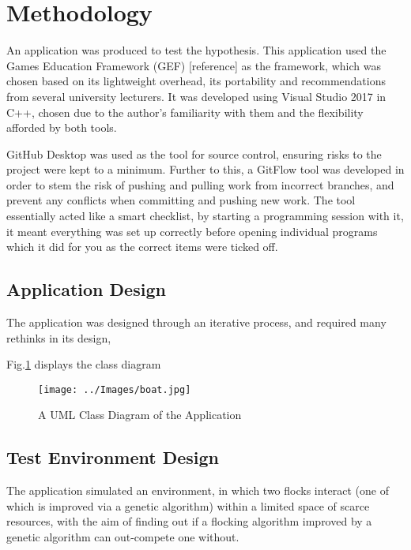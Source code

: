 \section{Methodology}
An application was produced to test the hypothesis. This application used the Games Education Framework (GEF) [reference] as the framework, which was chosen based on its lightweight overhead, its portability and recommendations from several university lecturers. It was developed using Visual Studio 2017 in C++, chosen due to the author's familiarity with them and the flexibility afforded by both tools.

GitHub Desktop was used as the tool for source control, ensuring risks to the project were kept to a minimum. Further to this, a GitFlow tool was developed in order to stem the risk of pushing and pulling work from incorrect branches, and prevent any conflicts when committing and pushing new work. The tool essentially acted like a smart checklist, by starting a programming session with it, it meant everything was set up correctly before opening individual programs which it did for you as the correct items were ticked off.


\subsection{Application Design}
The application was designed through an iterative process, and required many rethinks in its design, 

Fig.\ref{fig:classdiagram} displays the class diagram

\begin{figure}
	\texttt{[image: ../Images/boat.jpg]}
	\caption{A UML Class Diagram of the Application}
	\label{fig:classdiagram}
\end{figure}

\subsection{Test Environment Design}
The application simulated an environment, in which two flocks interact (one of which is improved via a genetic algorithm) within a limited space of scarce resources, with the aim of finding out if a flocking algorithm improved by a genetic algorithm can out-compete one without.

